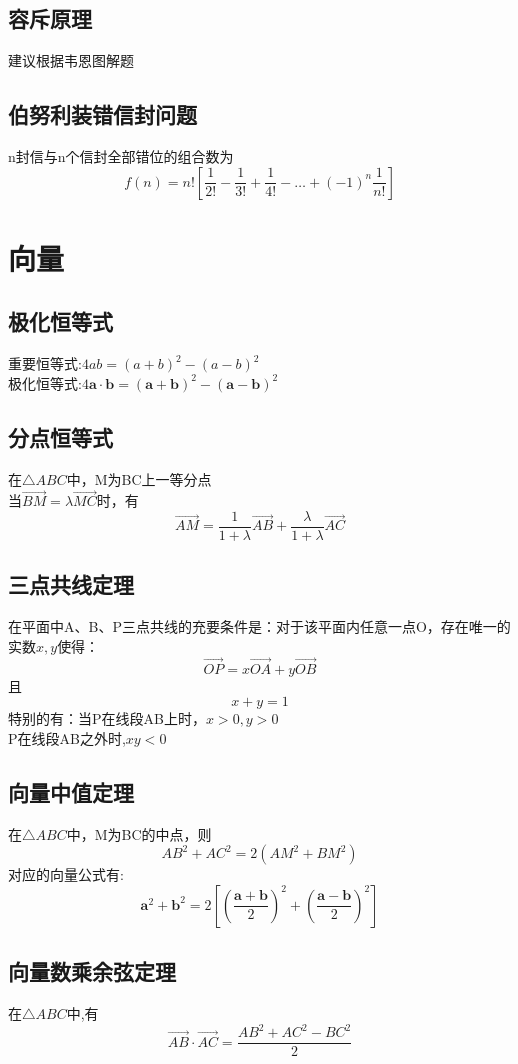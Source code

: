 \documentclass[UTF8]{ctexart}
\begin{document}
		\subsection{容斥原理}
			建议根据韦恩图解题
		\subsection{伯努利装错信封问题}
			n封信与n个信封全部错位的组合数为
			\[f(n)=n!\left[ \frac{1}{2!}-\frac{1}{3!}+\frac{1}{4!}-\dots +(-1)^n \frac{1}{n!} \right] \]
	\section{向量}
		\subsection{极化恒等式}
			重要恒等式:$4ab=(a+b)^2-(a-b)^2$\\
			\indent 极化恒等式:$4\boldsymbol{a}\cdot \boldsymbol{b}=(\boldsymbol{a}+\boldsymbol{b})^2-(\boldsymbol{a}-\boldsymbol{b})^2$
		\subsection{分点恒等式}
			在$\triangle ABC$中，M为BC上一等分点\\
			\indent 当$\overrightarrow{BM}=\lambda \overrightarrow{MC}时$，有
			\[\overrightarrow{AM}=\frac{1}{1+\lambda}\overrightarrow{AB}+\frac{\lambda}{1+\lambda}\overrightarrow{AC}\]
		\subsection{三点共线定理}
			在平面中A、B、P三点共线的充要条件是：对于该平面内任意一点O，存在唯一的实数$x,y$使得：
			\[\overrightarrow{OP}=x\overrightarrow{OA}+y\overrightarrow{OB} \]
			且
			\[x+y=1\]
			特别的有：当P在线段AB上时，$x>0,y>0$\\
			P在线段AB之外时,$xy<0$
		\subsection{向量中值定理}
			在$\triangle ABC$中，M为BC的中点，则
			\[AB^2+AC^2=2(AM^2+BM^2)\]
			对应的向量公式有:
			\[\boldsymbol{a}^2+\boldsymbol{b}^2=2\left[\left(\frac{\boldsymbol{a}+\boldsymbol{b}}{2}\right)^2 + \left(\frac{\boldsymbol{a}-\boldsymbol{b}}{2}\right)^2 \right] \]
		\subsection{向量数乘余弦定理}
			在$\triangle ABC$中,有
			\[\overrightarrow{AB}\cdot \overrightarrow{AC}=\frac{AB^2+AC^2-BC^2}{2}\]
\end{document}
